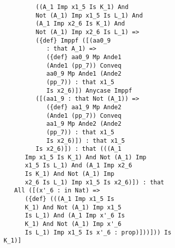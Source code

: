 \documentclass{article}
\begin{document}
\begin{verbatim}
                ((A_1 Imp x1_5 Is K_1) And 
                Not (A_1) Imp x1_5 Is L_1) And 
                (A_1 Imp x2_6 Is K_1) And 
                Not (A_1) Imp x2_6 Is L_1) => 
                ({def} Imppf ([(aa0_9 
                   : that A_1) => 
                   ({def} aa0_9 Mp Ande1 
                   (Ande1 (pp_7)) Conveq 
                   aa0_9 Mp Ande1 (Ande2 
                   (pp_7)) : that x1_5 
                   Is x2_6)]) Anycase Imppf 
                ([(aa1_9 : that Not (A_1)) => 
                   ({def} aa1_9 Mp Ande2 
                   (Ande1 (pp_7)) Conveq 
                   aa1_9 Mp Ande2 (Ande2 
                   (pp_7)) : that x1_5 
                   Is x2_6)]) : that x1_5 
                Is x2_6)]) : that (((A_1 
             Imp x1_5 Is K_1) And Not (A_1) Imp 
             x1_5 Is L_1) And (A_1 Imp x2_6 
             Is K_1) And Not (A_1) Imp 
             x2_6 Is L_1) Imp x1_5 Is x2_6)]) : that 
          All ([(x'_6 : in Nat) => 
             ({def} (((A_1 Imp x1_5 Is 
             K_1) And Not (A_1) Imp x1_5 
             Is L_1) And (A_1 Imp x'_6 Is 
             K_1) And Not (A_1) Imp x'_6 
             Is L_1) Imp x1_5 Is x'_6 : prop)]))])) Is 
       K_1)]



\end{verbatim}
\end{document}
